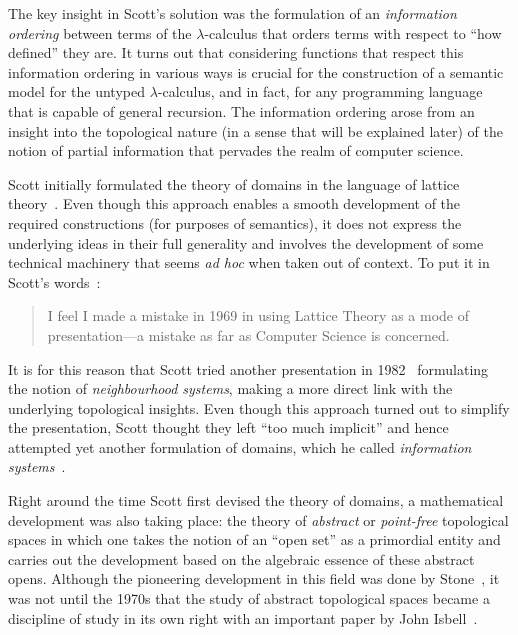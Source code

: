 \documentclass{article}
\begin{document}
The key insight in Scott's solution was the formulation of an \emph{information ordering}
between terms of the $\lambda$-calculus that orders terms with respect to ``how defined'' they
are. It turns out that considering functions that respect this information ordering in
various ways is crucial for the construction of a semantic model for the untyped
$\lambda$-calculus, and in fact, for any programming language that is capable of general
recursion. The information ordering arose from an insight into the topological nature (in
a sense that will be explained later) of the notion of partial information that pervades
the realm of computer science.

Scott initially formulated the theory of domains in the language of lattice
theory~\cite{birkhoff:1940}. Even though this approach enables a smooth development of the
required constructions (for purposes of semantics), it does not express the underlying
ideas in their full generality and involves the development of some technical machinery
that seems \emph{ad hoc} when taken out of context. To put it in Scott's
words~\cite[pg.~577]{scott:1982}:

\begin{quote}
  I feel I made a mistake in 1969 in using Lattice Theory as a mode of
  presentation---a mistake as far as Computer Science is concerned.
\end{quote}

It is for this reason that Scott tried another presentation in 1982~\cite{scott:1981}
formulating the notion of \emph{neighbourhood systems}, making a more direct link with the
underlying topological insights. Even though this approach turned out to simplify the
presentation, Scott thought they left ``too much implicit'' and hence attempted yet
another formulation of domains, which he called \emph{information systems}~\cite{scott:1982}.

Right around the time Scott first devised the theory of domains, a mathematical
development was also taking place: the theory of \emph{abstract} or \emph{point-free}
topological spaces in which one takes the notion of an ``open set'' as a primordial entity
and carries out the development based on the algebraic essence of these abstract opens.
Although the pioneering development in this field was done by Stone~\cite{stone:1934}, it
was not until the 1970s that the study of abstract topological spaces became a discipline
of study in its own right with an important paper by John Isbell~\cite{isbell:1973}.
\end{document}
